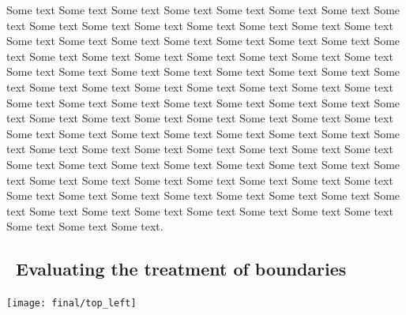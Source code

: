 \begin{multicols}{2}

  Some text Some text Some text Some text Some text Some text Some
  text Some text Some text Some text Some text Some text Some text
  Some text Some text Some text Some text Some text Some text Some
  text Some text Some text Some text Some text Some text Some text
  Some text Some text Some text Some text Some text Some text Some
  text Some text Some text Some text Some text Some text Some text
  Some text Some text Some text Some text Some text Some text Some
  text Some text Some text Some text Some text Some text Some text
  Some text Some text Some text Some text Some text Some text Some
  text Some text Some text Some text Some text Some text Some text
  Some text Some text Some text Some text Some text Some text Some
  text Some text Some text Some text Some text Some text Some text
  Some text Some text Some text Some text Some text Some text Some
  text Some text Some text Some text Some text Some text Some text
  Some text Some text Some text Some text Some text Some text Some
  text Some text Some text Some text Some text Some text Some text
  Some text Some text Some text Some text.


\subsection{\thesubsection~Evaluating the treatment of boundaries}

\end{multicols}
\graphicspath{{images/corners/}}
\begin{Figure}
  \centering
  \texttt{[image: final/top\_left]}
  \label{fig:P15_corner}
\end{Figure}
